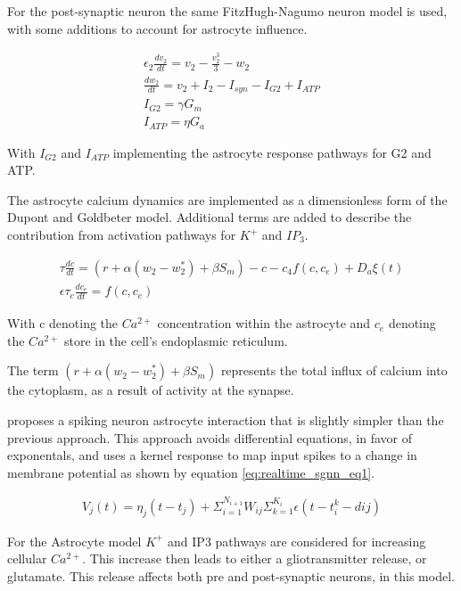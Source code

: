     For the post-synaptic neuron the same FitzHugh-Nagumo neuron model is used,
    with some additions to account for astrocyte influence.
    
    \begin{align}
        \epsilon_2 \frac{dv_2}{dt} = v_2 - \frac{v^3_2}{3} - w_2
        \\ \frac{dw_2}{dt} = v_2+I_2-I_{syn}-I_{G2}+I_{ATP} \\ I_{G2} = \gamma
        G_m \\ I_{ATP} = \eta G_a
    \end{align}
    
    With $I_{G2}$ and $I_{ATP}$ implementing the astrocyte response pathways for
    G2 and ATP.
    
    The astrocyte calcium dynamics are implemented as a dimensionless form of
    the Dupont and Goldbeter model. Additional terms are added to describe the
    contribution from activation pathways for $K^+$ and $IP_3$.
    
    \begin{align}
        \tau \frac{dc}{dt} = (r + \alpha(w_2 - w^*_2) + \beta S_m) - c - c_4
        f(c, c_e) + D_a \xi(t) \\ \epsilon \tau_c \frac{dc_e}{dt} = f(c, c_e)
    \end{align}
    
    With c denoting the $Ca^{2+}$ concentration within the astrocyte and $c_e$
    denoting the $Ca^{2+}$ store in the cell's endoplasmic reticulum.
    
    The term $(r + \alpha(w_2 - w^*_2) + \beta S_m)$ represents the total influx
    of calcium into the cytoplasm, as a result of activity at the synapse.
    
    \cite{realtime_sgnn} proposes a spiking neuron astrocyte interaction that is
    slightly simpler than the previous approach. This approach avoids
    differential equations, in favor of exponentals, and uses a kernel response
    to map input spikes to a change in membrane potential as shown by equation
    \ref{eq:realtime_sgnn_eq1}.
    
    \begin{align}
        V_j(t) = \eta_j(t - t_j) + \Sigma^{N_{i+1}}_{i=1}W_{ij}
        \Sigma^{K_i}_{k=1} \epsilon(t - t_i^k -
        d{ij}) \label{eq:realtime_sgnn_eq1}
    \end{align}
    
    For the Astrocyte model $K^+$ and IP3 pathways are considered for increasing
    cellular $Ca^{2+}$. This increase then leads to either a gliotransmitter
    release, or glutamate. This release affects both pre and post-synaptic
    neurons, in this model.
    
